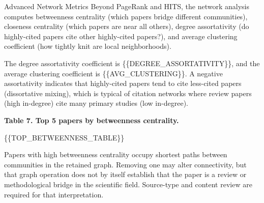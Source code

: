 \documentclass[
  ignorenonframetext,
]{beamer}
\begin{document}
\begin{frame}[allowframebreaks]{Advanced Network Metrics}
\label{advanced-network-metrics}
Beyond PageRank and HITS, the network analysis computes betweenness
centrality (which papers bridge different communities), closeness
centrality (which papers are near all others), degree assortativity (do
highly-cited papers cite other highly-cited papers?), and average
clustering coefficient (how tightly knit are local neighborhoods).

The degree assortativity coefficient is \{\{DEGREE\_ASSORTATIVITY\}\},
and the average clustering coefficient is \{\{AVG\_CLUSTERING\}\}. A
negative assortativity indicates that highly-cited papers tend to cite
less-cited papers (dissortative mixing), which is typical of citation
networks where review papers (high in-degree) cite many primary studies
(low in-degree).

\textbf{Table 7. Top 5 papers by betweenness centrality.}

\{\{TOP\_BETWEENNESS\_TABLE\}\}

Papers with high betweenness centrality occupy shortest paths between
communities in the retained graph. Removing one may alter connectivity,
but that graph operation does not by itself establish that the paper is
a review or methodological bridge in the scientific field. Source-type
and content review are required for that interpretation.
\end{frame}
\end{document}
